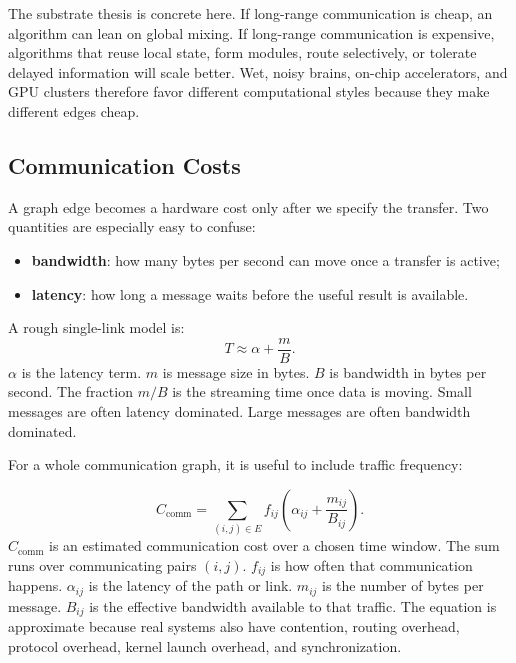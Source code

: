 The substrate thesis is concrete here. If long-range communication is cheap, an algorithm can lean on global mixing. If long-range communication is expensive, algorithms that reuse local state, form modules, route selectively, or tolerate delayed information will scale better. Wet, noisy brains, on-chip accelerators, and GPU clusters therefore favor different computational styles because they make different edges cheap.

\subsection{Communication Costs}

A graph edge becomes a hardware cost only after we specify the transfer. Two quantities are especially easy to confuse:

\begin{itemize}[leftmargin=*]
  \item \textbf{bandwidth}: how many bytes per second can move once a transfer is active;
  \item \textbf{latency}: how long a message waits before the useful result is available.
\end{itemize}

A rough single-link model is:
\[
  T \approx \alpha + \frac{m}{B}.
\]
\(\alpha\) is the latency term. \(m\) is message size in bytes. \(B\) is bandwidth in bytes per second. The fraction \(m/B\) is the streaming time once data is moving. Small messages are often latency dominated. Large messages are often bandwidth dominated.

For a whole communication graph, it is useful to include traffic frequency:

\begin{keyequation}
\[
  C_{\text{comm}}
  =
  \sum_{(i,j)\in E}
  f_{ij}
  \left(
    \alpha_{ij}
    +
    \frac{m_{ij}}{B_{ij}}
  \right).
\]
\tcblower
\(C_{\text{comm}}\) is an estimated communication cost over a chosen time window. The sum runs over communicating pairs \((i,j)\). \(f_{ij}\) is how often that communication happens. \(\alpha_{ij}\) is the latency of the path or link. \(m_{ij}\) is the number of bytes per message. \(B_{ij}\) is the effective bandwidth available to that traffic. The equation is approximate because real systems also have contention, routing overhead, protocol overhead, kernel launch overhead, and synchronization.
\end{keyequation}

